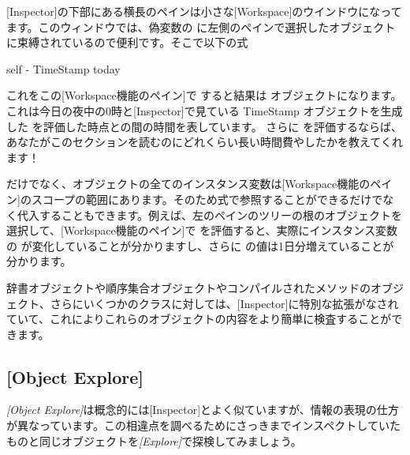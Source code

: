 \documentclass[a4paper,10pt,twoside]{book}
\begin{document}
[Inspector]の下部にある横長のペインは小さな[Workspace]のウインドウになってます。このウィンドウでは、偽変数の  に左側のペインで選択したオブジェクトに束縛されているので便利です。そこで以下の式
\begin{code}{}
self - TimeStamp today
\end{code}
これをこの[Workspace機能のペイン]で  すると結果は  オブジェクトになります。
これは今日の夜中の0時と[Inspector]で見ている TimeStamp オブジェクトを生成した  を評価した時点との間の時間を表しています。
さらに  を評価するならば、あなたがこのセクションを読むのにどれくらい長い時間費やしたかを教えてくれます！

 だけでなく、オブジェクトの全てのインスタンス変数は[Workspace機能のペイン]のスコープの範囲にあります。そのため式で参照することができるだけでなく代入することもできます。例えば、左のペインのツリーの根のオブジェクトを選択して、[Workspace機能のペイン]で  を評価すると、実際にインスタンス変数の  が変化していることが分かりますし、さらに  の値は1日分増えていることが分かります。

辞書オブジェクトや順序集合オブジェクトやコンパイルされたメソッドのオブジェクト、さらにいくつかのクラスに対しては、[Inspector]に特別な拡張がなされていて、これによりこれらのオブジェクトの内容をより簡単に検査することができます。

\subsection{[Object Explore]}

\emph{[Object Explore]}は概念的には[Inspector]とよく似ていますが、情報の表現の仕方が異なっています。この相違点を調べるためにさっきまでインスペクトしていたものと同じオブジェクトを\emph{[Explore]}で探検してみましょう。
\end{document}
